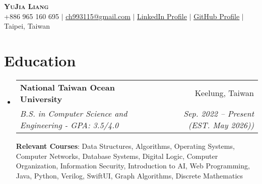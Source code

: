 \documentclass[letterpaper,11pt]{article}
\makeatletter
\newcommand{\resumeItem}[1]{
  \item\small{
    {#1 \vspace{-2pt}}
  }
}
\newcommand{\resumeSubheading}[4]{
  \vspace{-2pt}\item
    \begin{tabular*}{0.97\textwidth}[t]{l@{\extracolsep{\fill}}r}
      \textbf{#1} & #2 \\
      \textit{\small#3} & \textit{\small #4} \\
    \end{tabular*}\vspace{-7pt}
}
\newcommand{\resumeSubHeadingListStart}{\begin{itemize}[leftmargin=0.15in, label={}]}
\newcommand{\resumeSubHeadingListEnd}{\end{itemize}}
\newcommand{\resumeItemListStart}{\begin{itemize}}
\newcommand{\resumeItemListEnd}{\end{itemize}\vspace{-5pt}}
\makeatother
\begin{document}

\begin{center}
    \textbf{\Huge \scshape YuJia Liang} \\ \vspace{1pt}
    \small +886 965 160 695 $|$ \href{mailto:ch993115@gmail.com}{\underline{ch993115@gmail.com}} $|$ \href{https://www.linkedin.com/in/yu-jia-liang-77ab022a7}{\underline{LinkedIn Profile}} $|$ \href{https://github.com/itsYoga}{\underline{GitHub Profile}}
    $|$ {\small{Taipei, Taiwan}}
\end{center}


\section{Education}
  \resumeSubHeadingListStart
    \resumeSubheading
      {National Taiwan Ocean University}{Keelung, Taiwan}
      {B.S. in Computer Science and Engineering - GPA: 3.5/4.0} {Sep. 2022 -- Present (EST. May 2026))}\hfill \break

  \textbf{Relevant Courses}{: Data Structures, Algorithms, Operating Systems, Computer Networks, Database Systems, Digital Logic, Computer Organization, Information Security, Introduction to AI, Web Programming, Java, Python, Verilog, SwiftUI, Graph Algorithms, Discrete Mathematics} 

  \resumeSubHeadingListEnd


      
\end{document}
